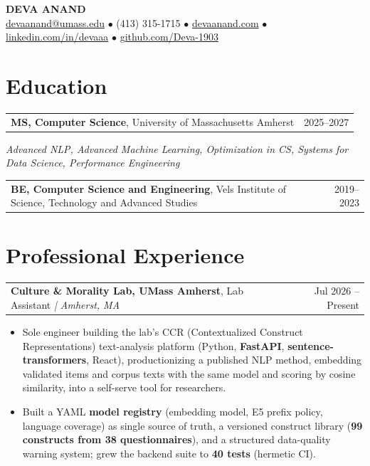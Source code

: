 \documentclass[letterpaper,11pt]{article}
\makeatletter
\newcommand{\eduItem}[3]{%
  \begin{tabular*}{\textwidth}{@{}l@{\extracolsep{\fill}}r@{}}
    \textbf{#1}, #2 & #3 \\
  \end{tabular*}\par
}
\newcommand{\expItem}[4]{%
  \vspace{2pt}
  \begin{tabular*}{\textwidth}{@{}l@{\extracolsep{\fill}}r@{}}
    \textbf{#1}, #2 \textit{| #3} & #4 \\
  \end{tabular*}\par\vspace{-3pt}
}
\makeatother
\begin{document}
\begin{center}
    {\fontsize{18}{20}\selectfont\bfseries DEVA ANAND}\\ \vspace{3pt}
    {\small
    \href{mailto:devaanand@umass.edu}{devaanand@umass.edu}
    \enspace$\bullet$\enspace
    (413) 315-1715
    \enspace$\bullet$\enspace
    \href{https://devaanand.com}{devaanand.com}
    \enspace$\bullet$\enspace
    \href{https://linkedin.com/in/devaaa/}{linkedin.com/in/devaaa}
    \enspace$\bullet$\enspace
    \href{https://github.com/Deva-1903}{github.com/Deva-1903}}
\end{center}
\vspace{-8pt}

\section{Education}
\eduItem{MS, Computer Science}{University of Massachusetts Amherst}{2025--2027}
{\small\textit{Advanced NLP, Advanced Machine Learning, Optimization in CS, Systems for Data Science, Performance Engineering}}\par
\vspace{3pt}
\eduItem{BE, Computer Science and Engineering}{Vels Institute of Science, Technology and Advanced Studies}{2019--2023}

\section{Professional Experience}

\expItem{Culture \& Morality Lab, UMass Amherst}{Lab Assistant}{Amherst, MA}{Jul 2026 -- Present}
\begin{itemize}
  \item Sole engineer building the lab's CCR (Contextualized Construct Representations) text-analysis platform (Python, \textbf{FastAPI}, \textbf{sentence-transformers}, React), productionizing a published NLP method, embedding validated items and corpus texts with the same model and scoring by cosine similarity, into a self-serve tool for researchers.
  \item Built a YAML \textbf{model registry} (embedding model, E5 prefix policy, language coverage) as single source of truth, a versioned construct library (\textbf{99 constructs from 38 questionnaires}), and a structured data-quality warning system; grew the backend suite to \textbf{40 tests} (hermetic CI).
\end{itemize}
\end{document}
